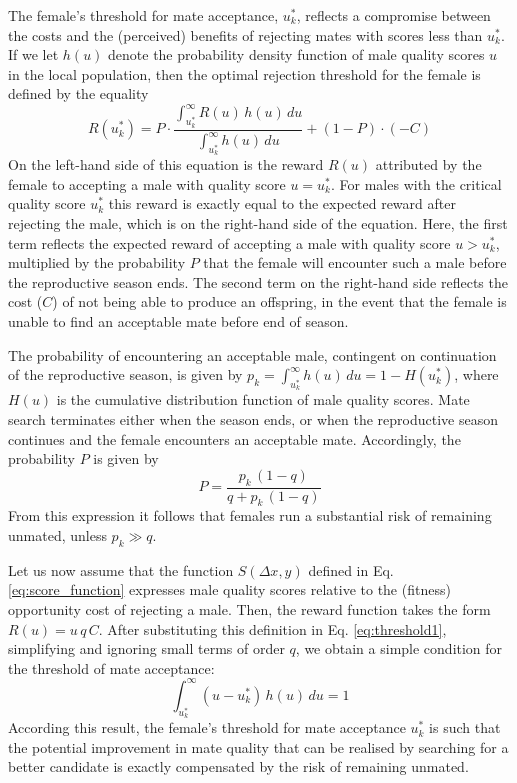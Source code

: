 \documentclass[11pt]{article}
\begin{document}
The female's threshold for mate acceptance, $u^*_k$, reflects a compromise between the costs and the (perceived) benefits of rejecting mates with scores less than $u^*_k$. If we let $h(u)$ denote the probability density function of male quality scores $u$ in the local population, then the optimal rejection threshold for the female is defined by the equality
\begin{equation}
\label{eq:threshold1}
R(u^*_k) = P \cdot \frac{\int_{u^*_k}^{\infty} R(u)\,h(u)\,du }{\int_{u^*_k}^{\infty} h(u)\,du } + (1-P) \cdot (-C)
\end{equation}     
On the left-hand side of this equation is the reward $R(u)$ attributed by the female to accepting a male with quality score $u = u^*_k$. For males with the critical quality score $u^*_k$ this reward is exactly equal to the expected reward after rejecting the male, which is on the right-hand side of the equation. Here, the first term reflects the expected reward of accepting a male with quality score $u > u^*_k$, multiplied by the probability $P$ that the female will encounter such a male before the reproductive season ends. The second term on the right-hand side reflects the cost ($C$) of not being able to produce an offspring, in the event that the female is unable to find an acceptable mate before end of season. 

The probability of encountering an acceptable male, contingent on continuation of the reproductive season, is given by $p_k = \int_{u^*_k}^{\infty} h(u)\,du = 1 - H(u^*_k)$, where $H(u)$ is the cumulative distribution function of male quality scores. Mate search terminates either when the season ends, or when the reproductive season continues and the female encounters an acceptable mate. Accordingly, the probability $P$ is given by
\begin{equation}
P = \frac{p_k \, (1-q)}{q + p_k \, (1-q)} 
\end{equation}  
From this expression it follows that females run a substantial risk of remaining unmated, unless $p_k \gg q$. 

Let us now assume that the function $S(\Delta x, y)$ defined in Eq. \eqref{eq:score_function} expresses male quality scores relative to the (fitness) opportunity cost of rejecting a male. Then, the reward function takes the form $R(u) = u\,q\,C$. After substituting this definition in Eq. \eqref{eq:threshold1}, simplifying and ignoring small terms of order $q$, we obtain a simple condition for the threshold of mate acceptance: 
\begin{equation}
\label{eq:threshold2}
\int_{u^*_k}^{\infty} (u - u^*_k)\,h(u)\,du = 1
\end{equation} 
According this result, the female's threshold for mate acceptance $u^*_k$ is such that the potential improvement in mate quality that can be realised by searching for a better candidate is exactly compensated by the risk of remaining unmated.
\end{document}
